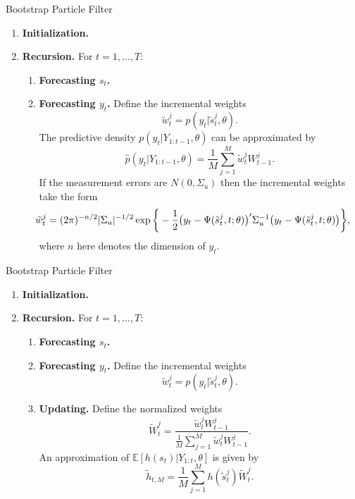 \documentclass[presentation]{beamer}
\newcommand{\be}{\begin{equation}}
\newcommand{\ee}{\end{equation}}
\begin{document}
\begin{frame}[label={sec:org5ddc932}]{Bootstrap Particle Filter}
\begin{enumerate}
	\item {\bf Initialization.} 
	\item {\bf Recursion.} For $t=1,\ldots,T$:
	\begin{enumerate}
		\item {\bf Forecasting $s_t$.} 
		\item {\bf Forecasting $y_t$.} Define the incremental weights
		\be
		\tilde{w}^j_t = p(y_t|\tilde{s}^j_t,\theta).
		\ee
		The predictive density $p(y_t|Y_{1:t-1},\theta)$
		can be approximated by
		\be
		\hat{p}(y_t|Y_{1:t-1},\theta) = \frac{1}{M} \sum_{j=1}^M \tilde{w}^j_t W_{t-1}^j.
		\ee
		If the measurement errors are $N(0,\Sigma_u)$ then the incremental weights take the form
		\be\hspace{-0.2in}
		\tilde{w}_t^j = (2 \pi)^{-n/2} |\Sigma_u|^{-1/2}
		\exp \bigg\{ - \frac{1}{2} \big(y_t - \Psi(\tilde{s}^j_t,t;\theta) \big)'\Sigma_u^{-1}
		\big(y_t - \Psi(\tilde{s}^j_t,t;\theta)\big) \bigg\}, \label{eq_pfincrweightgaussian}
		\ee
		where $n$ here denotes the dimension of $y_t$.
	\end{enumerate}
\end{enumerate}
\end{frame}


\begin{frame}[label={sec:org39cec2b}]{Bootstrap Particle Filter}
\begin{enumerate}
	\item {\bf Initialization.} 

	\item {\bf Recursion.} For $t=1,\ldots,T$:
	\begin{enumerate}
		\item {\bf Forecasting $s_t$.} 
		\item {\bf Forecasting $y_t$.} Define the incremental weights
		\be
		\tilde{w}^j_t = p(y_t|\tilde{s}^j_t,\theta).
		\ee
		\item {\bf Updating.} Define the normalized weights
		\be
		\tilde{W}^j_t = \frac{ \tilde{w}^j_t W^j_{t-1} }{ \frac{1}{M} \sum_{j=1}^M \tilde{w}^j_t W^j_{t-1} }.
		\ee
		An approximation of $\mathbb{E}[h(s_t)|Y_{1:t},\theta]$ is given by
		\be
		\tilde{h}_{t,M} = \frac{1}{M} \sum_{j=1}^M h(\tilde{s}_t^j) \tilde{W}_{t}^j.
		\label{eq_pfhtildett}
		\ee
	\end{enumerate}		
\end{enumerate}
\end{frame}
\end{document}
